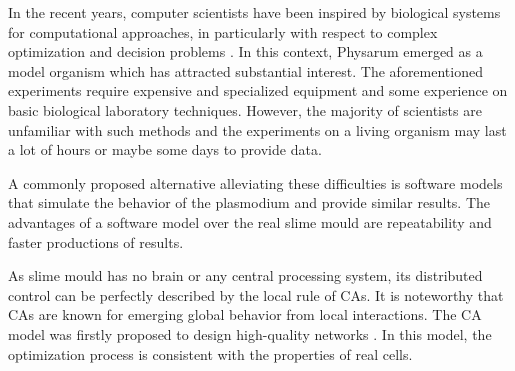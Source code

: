 \par
In the recent years, computer scientists have been inspired by biological systems for computational approaches, in particularly with respect to complex optimization and decision problems \cite{grube2016physarum}. In this context, Physarum emerged as a model organism which has attracted substantial interest. The aforementioned experiments require expensive and specialized equipment and some experience on basic biological laboratory techniques. However, the majority of scientists are unfamiliar with such methods and the experiments on a living organism may last a lot of hours or maybe some days to provide data.
\par
A commonly proposed alternative alleviating these difficulties is software models that simulate the behavior of the plasmodium and provide similar results. The advantages of a software model over the real slime mould are repeatability and faster productions of results.
\par
As slime mould has no brain or any central processing system, its distributed control can be perfectly described by the local rule of CAs. It is noteworthy that CAs are known for emerging global behavior from local interactions. The CA model was firstly proposed to design high-quality networks \cite{gunji2008minimal}. In this model, the optimization process is consistent with the properties of real cells. 
